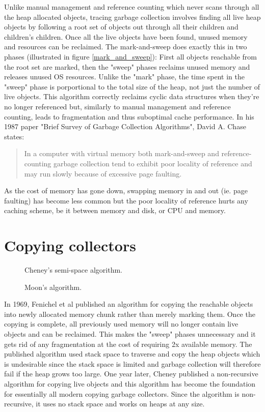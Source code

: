\documentclass[a4paper,oneside]{memoir}
\begin{document}
Unlike manual management and reference counting which never scans through all
the heap allocated objects, tracing garbage collection involves finding all live
heap objects by following a root set of objects out through all their children
and children's children.\cite{Appel:1987} Once all the live objects have been found, unused memory
and resources can be reclaimed.
The mark-and-sweep does exactly this in two phases (illustrated in figure \ref{mark_and_sweep}): First all objects reachable
from the root set are marked, then the "sweep" phases reclaims unused memory and
releases unused OS resources. Unlike the "mark" phase, the time spent in the
"sweep" phase is porportional to the total size of the heap, not just the number
of live objects.\cite{Wilson:1992}
This algorithm correctly reclaims cyclic data structures when they're no longer
referenced but, similarly to manual management and reference counting, leads to
fragmentation and thus suboptimal cache performance.
In his 1987 paper "Brief Survey of Garbage Collection Algorithms", David A. Chase states:
\blockquote{In a computer with virtual memory both mark-and-sweep and
reference-counting garbage collection tend to exhibit poor locality of reference
and may run slowly because of excessive page faulting.}
\cite{Chase:1987} As the cost of memory has gone down, swapping memory in and
out (ie. page faulting) has become less common but the poor locality of reference
hurts any caching scheme, be it between memory and disk, or CPU and memory.\cite{Grunwald:1993}


\section{Copying collectors}
\begin{figure}
  \centering
  
  \caption{Cheney's semi-space algorithm.}
  \label{cheney_algorithm}
\end{figure}
\begin{figure}[b]
  \centering
  
  \caption{Moon's algorithm.}
  \label{moon_algorithm}
\end{figure}

In 1969, Fenichel et al published an algorithm for copying the reachable objects
into newly allocated memory chunk rather than merely marking them.\cite{Fenichel} Once the copying
is complete, all previously used memory will no longer contain live objects
and can be reclaimed. This makes the "sweep" phases unnecessary and it gets rid
of any fragmentation at the cost of requiring 2x available memory. The published
algorithm used stack space to traverse and copy the heap objects which is
undesirable since the stack space is limited and garbage collection will therefore
fail if the heap grows too large. One year later, Cheney published a non-recursive
algorithm for copying live objects and this algorithm has become the foundation
for essentially all modern copying garbage collectors.\cite{Cheney:1970} Since the algorithm is
non-recursive, it uses no stack space and works on heaps at any size.
\end{document}
